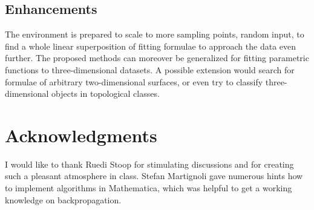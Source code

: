 \documentclass[useAMS,usenatbib]{mn2e}
\begin{document}
\subsection{Enhancements}
The environment is prepared to scale to more sampling points, random
input, to find a whole linear superposition of fitting formulae to
approach the data even further. The proposed methods can moreover be
generalized for fitting parametric functions to three-dimensional
datasets. A possible extension would search for formulae of arbitrary
two-dimensional surfaces, or even try to classify three-dimensional
objects in topological classes.

\section{Acknowledgments}
\label{sec:Acknowledgments}
%
I would like to thank Ruedi Stoop for stimulating discussions and for
creating such a pleasant atmosphere in class. Stefan Martignoli gave
numerous hints how to implement algorithms in {\sc Mathematica}, which
was helpful to get a working knowledge on backpropagation.

%
%

%
%
%
%
% 
%
%

%
\label{lastpage}
\end{document}
